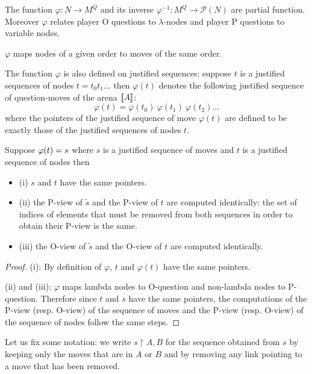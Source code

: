 The function $\varphi : N \rightarrow M^Q$ and its inverse
$\varphi^{-1} : M^Q \rightarrow \mathcal{P}(N)$ are partial function.
Moreover $\varphi$ relates player O questions to $\lambda$-nodes
and player P questions to variable nodes.

\begin{property}
\label{proper:phi_conserve_order}
$\varphi$ maps nodes of a given order to moves of the same order.
\end{property}


The function $\varphi$ is also defined on justified sequences: suppose $t$
is a justified sequences of nodes $t = t_0 t_1 \ldots$ then $\varphi(t)$ denotes
the following justified sequence of question-moves of the arena ${[\![ A ]\!]}$:
$$\varphi(t) = \varphi(t_0)\ \varphi(t_1)\  \varphi(t_2) \ldots$$
where the pointers of the justified sequence of move $\varphi(t)$ are defined to be exactly those
of the justified sequences of nodes $t$.


\begin{property}
\label{proper:phi_pview} Suppose $\varphi(t) = s$ where $s$ is a
justified sequence of moves and $t$ is a justified sequence of nodes
then
\begin{itemize}
\item (i) $s$ and $t$ have the same pointers.
\item (ii) the P-view of $\tilde{s}$ and the P-view of $t$ are computed
identically: the set of indices of elements that must be removed
from both sequences in order to obtain their P-view is the same.
\item (iii) the O-view of $\tilde{s}$ and the O-view of $t$ are computed identically.
\end{itemize}
\end{property}
\begin{proof}
(i): By definition of $\varphi$, $t$ and $\varphi(t)$ have the same
pointers.

(ii) and (iii): $\varphi$ maps lambda nodes to O-question and
non-lambda nodes to P-question. Therefore since $t$ and $s$ have the
same pointers, the computations of the P-view (resp. O-view) of the
sequence of moves and the P-view (resp. O-view) of the sequence of
nodes follow the same steps.
\end{proof}


Let us fix some notation: we write $s\upharpoonright A,B$ for the
sequence obtained from $s$ by keeping only the moves that are in $A$ or $B$ and by removing any link pointing to a move that
has been removed.

